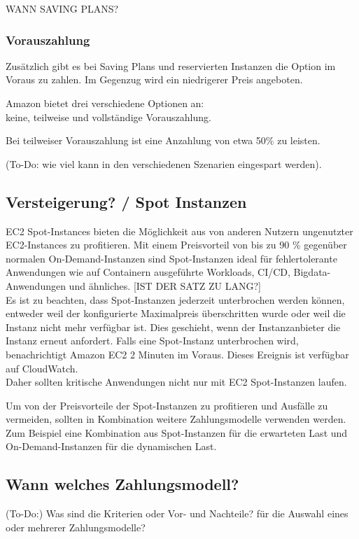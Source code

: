 WANN SAVING PLANS? 

\subsubsection{Vorauszahlung}
Zusätzlich gibt es bei Saving Plans und reservierten Instanzen die Option im Voraus zu zahlen.
Im Gegenzug wird ein niedrigerer Preis angeboten.

Amazon bietet drei verschiedene Optionen an:\\ 
keine, teilweise und vollständige Vorauszahlung.

Bei teilweiser Vorauszahlung ist eine Anzahlung von etwa 50\% zu leisten.

(To-Do: wie viel kann in den verschiedenen Szenarien eingespart werden).

\subsection{Versteigerung? / Spot Instanzen }
EC2 Spot-Instances bieten die Möglichkeit aus von anderen Nutzern ungenutzter EC2-Instances zu profitieren.
Mit einem Preisvorteil von bis zu 90 \% gegenüber normalen On-Demand-Instanzen sind Spot-Instanzen ideal für fehlertolerante Anwendungen wie auf Containern ausgeführte Workloads, CI/CD, Bigdata-Anwendungen und ähnliches.
[IST DER SATZ ZU LANG?]
\\
Es ist zu beachten, dass Spot-Instanzen jederzeit unterbrochen werden können, entweder weil der konfigurierte Maximalpreis überschritten wurde oder weil die Instanz nicht mehr verfügbar ist. Dies geschieht, wenn der Instanzanbieter die Instanz erneut anfordert. Falls eine Spot-Instanz unterbrochen wird, benachrichtigt Amazon EC2 2 Minuten im Voraus. Dieses Ereignis ist verfügbar auf CloudWatch.
\\
Daher sollten kritische Anwendungen nicht nur mit EC2 Spot-Instanzen laufen.

Um von der Preisvorteile der Spot-Instanzen zu profitieren und Ausfälle zu vermeiden, sollten in Kombination weitere Zahlungsmodelle verwenden werden.
\\
Zum Beispiel eine Kombination aus Spot-Instanzen für die erwarteten Last und On-Demand-Instanzen für die dynamischen Last.


\subsection{Wann welches Zahlungsmodell?}
(To-Do:) Was sind die Kriterien oder Vor- und Nachteile? für die Auswahl eines oder mehrerer Zahlungsmodelle?



